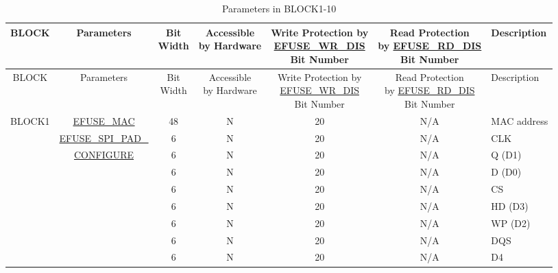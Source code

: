 \begin{longtable}[l]{ |c|c|c|c|c|c|m{2.2cm}| }
    \caption{Parameters in BLOCK1-10}
    \label{table:BLOCK1_10_Parameter}
    \\\hline
    \rowcolor{lightgray}
    BLOCK  & Parameters  & \footnotesize\makecell[c]{Bit\\Width} & \footnotesize\makecell[c]{Accessible\\ by Hardware} &\footnotesize\makecell[c]{Write Protection by\\ \hyperref[fielddesc:EFUSEWRDIS]{EFUSE\_WR\_DIS} \\Bit Number} &
     \footnotesize\makecell[c]{Read Protection\\ by \hyperref[fielddesc:EFUSERDDIS]{EFUSE\_RD\_DIS} \\Bit Number} &
     Description \\
     \hline
    \endfirsthead
    \hline
    \rowcolor{lightgray}
    BLOCK  & Parameters  & \footnotesize\makecell[c]{Bit\\Width} & \footnotesize\makecell[c]{Accessible\\ by Hardware} &\footnotesize\makecell[c]{Write Protection by\\ \hyperref[fielddesc:EFUSEWRDIS]{EFUSE\_WR\_DIS} \\Bit Number} &
     \footnotesize\makecell[c]{Read Protection\\ by \hyperref[fielddesc:EFUSERDDIS]{EFUSE\_RD\_DIS} \\Bit Number} &
     Description \\
    \endhead
    \endfoot
    \hline
    \endlastfoot
    BLOCK1 & \hyperref[fielddesc:EFUSEMAC0]{EFUSE\_MAC} & 48 & N & 20 & N/A & MAC address \\\cline{2-7}
    & \hyperref[fielddesc:EFUSESPIPADCONF0]{EFUSE\_SPI\_PAD\_}& 6 & N & 20 & N/A & {CLK} \\
    \cline{3-7}
    & \hyperref[fielddesc:EFUSESPIPADCONF0]{CONFIGURE} & 6 & N & 20 & N/A & Q (D1) \\
    \cline{3-7}
    & & 6 & N & 20 & N/A & D (D0) \\
    \cline{3-7}
    & & 6 & N & 20 & N/A & CS\\
    \cline{3-7}
    & & 6 & N & 20 & N/A & HD (D3) \\
    \cline{3-7}
    & & 6 & N & 20 & N/A & WP (D2) \\
    \cline{3-7}
    & & 6 & N & 20 & N/A & DQS \\
    \cline{3-7}
    & & 6 & N & 20 & N/A & D4 \\

\end{longtable}
